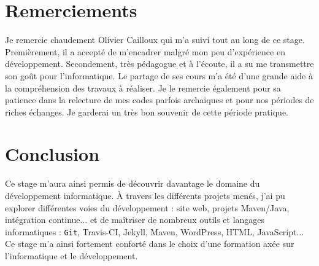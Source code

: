 \chapter*{Remerciements}

Je remercie chaudement Olivier Cailloux qui m’a suivi tout au long de ce stage. Premièrement, il a accepté de m'encadrer malgré mon peu d'expérience en développement. Secondement, très pédagogue et à l’écoute, il a su me transmettre son goût pour l'informatique. Le partage de ses cours m'a été d'une grande aide à la compréhension des travaux à réaliser. Je le remercie également pour sa patience dans la relecture de mes codes parfois archaïques et pour nos périodes de riches échanges. Je garderai un très bon souvenir de cette période pratique.

\vspace{30pt}
{\let\clearpage\relax\chapter*{Conclusion
}}

Ce stage m'aura ainsi permis de découvrir davantage le domaine du développement informatique. À travers les différents projets menés, j'ai pu explorer différentes voies du développement : site web, projets Maven/Java, intégration continue... et de maîtriser de nombreux outils et langages informatiques : \texttt{Git}, Travis-CI, Jekyll, Maven, WordPress, HTML, JavaScript... Ce stage m’a ainsi fortement conforté dans le choix d'une formation axée sur l'informatique et le développement.

